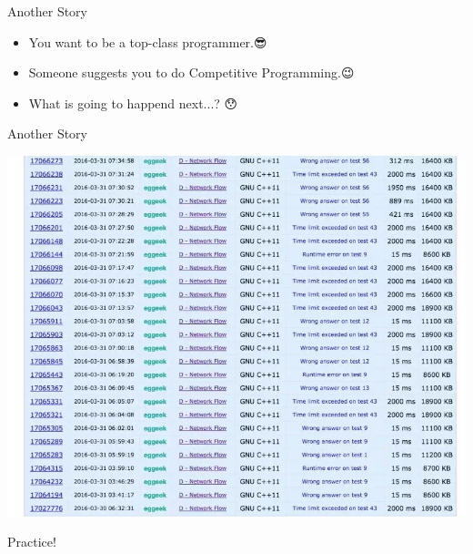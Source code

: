 \begin{frame}{Another Story}
\begin{itemize}
  \item<1-> You want to be a top-class programmer.😎
  \item<2-> Someone suggests you to do Competitive Programming.😉
  \item<3-> What is going to happend next...? 😯
\end{itemize}
\end{frame}

\begin{frame}{Another Story}
\begin{minipage}{.75\textwidth}
  \begin{adjustbox}{max totalsize={1.\textwidth}{1.\textheight}, left}
  \centering
  \includegraphics[width=\textwidth]{pic/sub0.jpg}
  \end{adjustbox}
\end{minipage}%
\begin{minipage}{.25\textwidth}
  Practice!
\end{minipage}
\end{frame}


